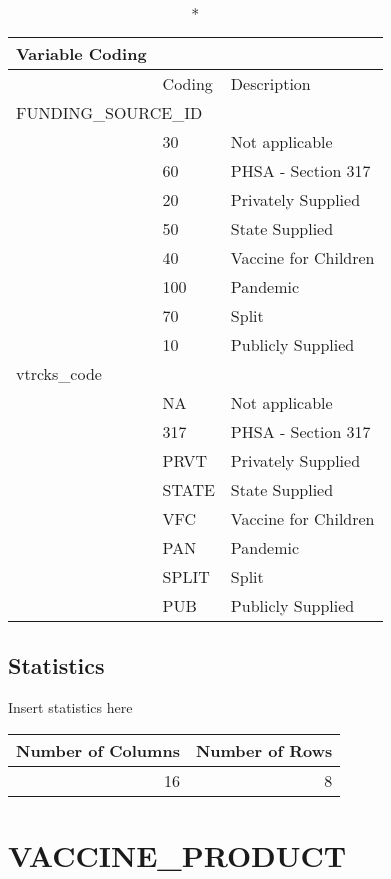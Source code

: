 \documentclass[
  letterpaper,
  DIV=11,
  numbers=noendperiod]{scrreprt}
\begin{document}
\begin{longtable}{l|ll}
\caption*{
{\large Variable Coding}
} \\ 
\toprule
\multicolumn{1}{l}{} & Coding & Description \\ 
\midrule
\multicolumn{3}{l}{FUNDING\_SOURCE\_ID} \\ 
\midrule
  & 30 & Not applicable \\ 
  & 60 & PHSA - Section 317 \\ 
  & 20 & Privately Supplied \\ 
  & 50 & State Supplied \\ 
  & 40 & Vaccine for Children \\ 
  & 100 & Pandemic \\ 
  & 70 & Split \\ 
  & 10 & Publicly Supplied \\ 
\midrule
\multicolumn{3}{l}{vtrcks\_code} \\ 
\midrule
  & NA & Not applicable \\ 
  & 317 & PHSA - Section 317 \\ 
  & PRVT & Privately Supplied \\ 
  & STATE & State Supplied \\ 
  & VFC & Vaccine for Children \\ 
  & PAN & Pandemic \\ 
  & SPLIT & Split \\ 
  & PUB & Publicly Supplied \\ 
\bottomrule
\end{longtable}

\hypertarget{statistics-48}{%
\section*{Statistics}\label{statistics-48}}

Insert statistics here

\begin{longtable}{rr}
\toprule
Number of Columns & Number of Rows \\ 
\midrule
16 & 8 \\ 
\bottomrule
\end{longtable}

\hypertarget{vaccine_product}{%
\chapter*{VACCINE\_PRODUCT}\label{vaccine_product}}
\end{document}
